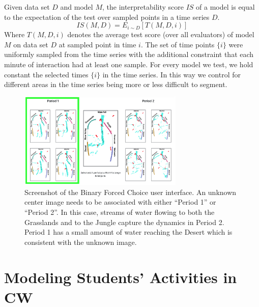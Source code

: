 \documentclass[letterpaper]{article}
\begin{document}
Given data set $D$ and model $M$, the interpretability score $IS$ of a model is equal to the expectation   of the test over sampled points in a time series $D$.
\begin{equation}
\label{eq:interpretability_score_eq}
IS(M,D) = E_{i\sim D} [ T (M,D,i)]
\end{equation}
Where $T(M,D,i)$  denotes the average test score (over all evaluators) of model $M$ on data set $D$ at sampled point in time $i$. The set of time points $\{i\}$ were uniformly sampled from the time series with the additional constraint that each minute of interaction had at least one sample.
For every model we test, we hold constant the selected times $\{i\}$ in the time series. In this way we  control for different areas in the time series being more or less difficult to segment.




\begin{figure}[t]
\centering
\includegraphics[width=0.70\textwidth]{images/test2_screenshot}
\caption{Screenshot of the  Binary Forced Choice  user interface. An unknown center image needs to be associated with either ``Period 1'' or ``Period 2''. In this case, streams of water flowing to both the Grasslands and to the Jungle capture the dynamics in Period 2. Period 1 has a small amount of water reaching the Desert which is consistent with the unknown image.}
\label{fig:test2_screenshot}
\end{figure}



















\section{Modeling Students' Activities in CW}
\label{sec:model_for_segmenting_time}
\end{document}
